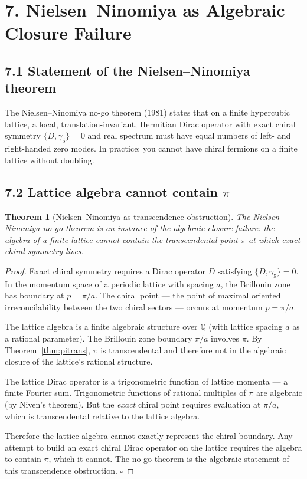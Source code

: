 \documentclass[11pt]{article}
\newtheorem{theorem}{Theorem}[section]
\theoremstyle{definition}
\theoremstyle{remark}
\begin{document}
\section{7. Nielsen--Ninomiya as Algebraic Closure Failure}

\subsection{7.1 Statement of the Nielsen--Ninomiya theorem}

The Nielsen--Ninomiya no-go theorem (1981) states that on a finite
hypercubic lattice, a local, translation-invariant, Hermitian
Dirac operator with exact chiral symmetry $\{D,\gamma_5\}=0$ and
real spectrum must have equal numbers of left- and right-handed
zero modes. In practice: you cannot have chiral fermions on a
finite lattice without doubling.

\subsection{7.2 Lattice algebra cannot contain $\pi$}

\begin{theorem}[Nielsen--Ninomiya as transcendence obstruction]\label{thm:nn}
The Nielsen--Ninomiya no-go theorem is an instance of the algebraic
closure failure: the algebra of a finite lattice cannot contain the
transcendental point $\pi$ at which exact chiral symmetry lives.
\end{theorem}

\begin{proof}
Exact chiral symmetry requires a Dirac operator $D$ satisfying
$\{D,\gamma_5\}=0$. In the momentum space of a periodic lattice with
spacing $a$, the Brillouin zone has boundary at $p=\pi/a$. The
chiral point --- the point of maximal oriented irreconcilability
between the two chiral sectors --- occurs at momentum $p=\pi/a$.

The lattice algebra is a finite algebraic structure over $\mathbb{Q}$
(with lattice spacing $a$ as a rational parameter). The Brillouin zone
boundary $\pi/a$ involves $\pi$. By Theorem~\ref{thm:pitrans}, $\pi$
is transcendental and therefore not in the algebraic closure of the
lattice's rational structure.

The lattice Dirac operator is a trigonometric function of lattice
momenta --- a finite Fourier sum. Trigonometric functions of rational
multiples of $\pi$ are algebraic (by Niven's theorem). But the
\emph{exact} chiral point requires evaluation at $\pi/a$, which is
transcendental relative to the lattice algebra.

Therefore the lattice algebra cannot exactly represent the chiral
boundary. Any attempt to build an exact chiral Dirac operator on the
lattice requires the algebra to contain $\pi$, which it cannot. The
no-go theorem is the algebraic statement of this transcendence
obstruction. $\square$
\end{proof}
\end{document}

